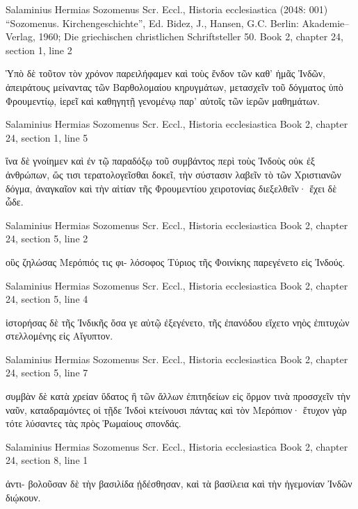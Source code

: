 \documentclass[12pt,letterpaper,twoside,final]{memoir}
\begin{document}
\begin{greek}


Salaminius Hermias Sozomenus Scr. Eccl., Historia ecclesiastica (2048: 001)
“Sozomenus. Kirchengeschichte”, Ed. Bidez, J., Hansen, G.C.
Berlin: Akademie–Verlag, 1960; Die griechischen christlichen Schriftsteller 50.
Book 2, chapter 24, section 1, line 2

Ὑπὸ δὲ τοῦτον τὸν χρόνον παρειλήφαμεν καὶ τοὺς ἔνδον τῶν καθ' ἡμᾶς 
Ἰνδῶν, ἀπειράτους μείναντας τῶν Βαρθολομαίου κηρυγμάτων, μετασχεῖν 
τοῦ δόγματος ὑπὸ Φρουμεντίῳ, ἱερεῖ καὶ καθηγητῇ γενομένῳ παρ' αὐτοῖς 
τῶν ἱερῶν μαθημάτων. 



Salaminius Hermias Sozomenus Scr. Eccl., Historia ecclesiastica 
Book 2, chapter 24, section 1, line 5

                         ἵνα δὲ γνοίημεν καὶ ἐν τῷ παραδόξῳ τοῦ συμβάντος 
περὶ τοὺς Ἰνδοὺς οὐκ ἐξ ἀνθρώπων, ὥς τισι τερατολογεῖσθαι δοκεῖ, τὴν 
σύστασιν λαβεῖν τὸ τῶν Χριστιανῶν δόγμα, ἀναγκαῖον καὶ τὴν αἰτίαν τῆς 
Φρουμεντίου χειροτονίας διεξελθεῖν· ἔχει δὲ ὧδε. 



Salaminius Hermias Sozomenus Scr. Eccl., Historia ecclesiastica 
Book 2, chapter 24, section 5, line 2

                                               οὓς ζηλώσας Μερόπιός τις φι-
λόσοφος Τύριος τῆς Φοινίκης παρεγένετο εἰς Ἰνδούς. 



Salaminius Hermias Sozomenus Scr. Eccl., Historia ecclesiastica 
Book 2, chapter 24, section 5, line 4

                                                       ἱστορήσας δὲ τῆς Ἰνδικῆς   
ὅσα γε αὐτῷ ἐξεγένετο, τῆς ἐπανόδου εἴχετο νηὸς ἐπιτυχὼν στελλομένης εἰς 
Αἴγυπτον. 



Salaminius Hermias Sozomenus Scr. Eccl., Historia ecclesiastica 
Book 2, chapter 24, section 5, line 7

             συμβὰν δὲ κατὰ χρείαν ὕδατος ἢ τῶν ἄλλων ἐπιτηδείων εἰς ὅρμον 
τινὰ προσσχεῖν τὴν ναῦν, καταδραμόντες οἱ τῇδε Ἰνδοὶ κτείνουσι πάντας καὶ 
τὸν Μερόπιον· ἔτυχον γὰρ τότε λύσαντες τὰς πρὸς Ῥωμαίους σπονδάς. 



Salaminius Hermias Sozomenus Scr. Eccl., Historia ecclesiastica 
Book 2, chapter 24, section 8, line 1

                                                                            ἀντι-
βολοῦσαν δὲ τὴν βασιλίδα ᾐδέσθησαν, καὶ τὰ βασίλεια καὶ τὴν ἡγεμονίαν 
Ἰνδῶν διῴκουν. 




\end{greek}
\end{document}
